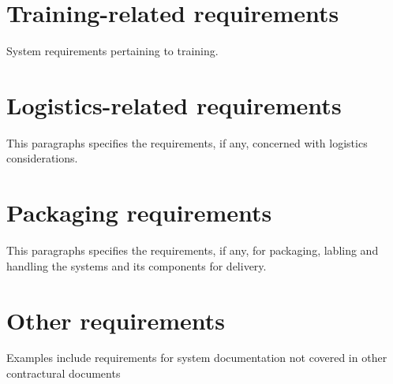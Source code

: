 \section{Training-related requirements}
System requirements pertaining to training.

\section{Logistics-related requirements}
This paragraphs specifies the requirements, if  any, concerned with logistics considerations.

\section{Packaging requirements}
This paragraphs specifies the requirements, if any, for packaging, labling and handling the systems and its components for delivery.

\section{Other requirements}
Examples include requirements for system documentation
not covered in other contractural documents